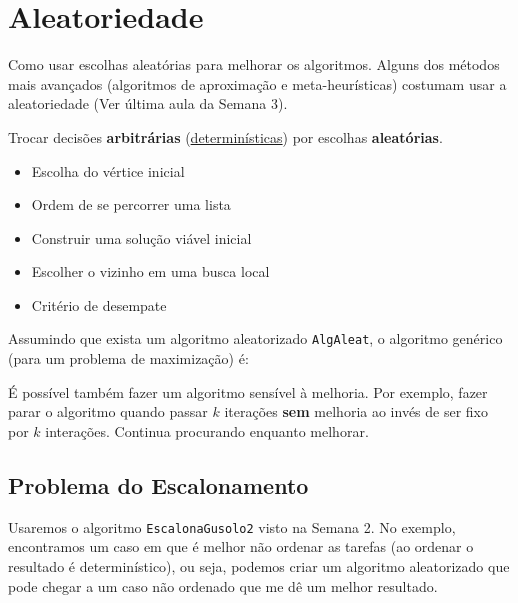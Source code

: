 \chapter{Aleatoriedade}

Como usar escolhas aleatórias para melhorar os algoritmos. Alguns dos métodos mais avançados (algoritmos de aproximação e meta-heurísticas) costumam usar a aleatoriedade (Ver última aula da Semana 3).

Trocar decisões \textbf{arbitrárias} (\underline{determinísticas}) por escolhas \textbf{aleatórias}.

\begin{itemize}
	\item Escolha do vértice inicial
	\item Ordem de se percorrer uma lista
	\item Construir uma solução viável inicial
	\item Escolher o vizinho em uma busca local
	\item Critério de desempate
\end{itemize}

Assumindo que exista um algoritmo aleatorizado \lstinline{AlgAleat}, o algoritmo genérico (para um problema de maximização) é:

\begin{algorithm}
	\SetAlgoLined
\end{algorithm}

É possível também fazer um algoritmo sensível à melhoria. Por exemplo, fazer parar o algoritmo quando passar $k$ iterações \textbf{sem} melhoria ao invés de ser fixo por $k$ interações. Continua procurando enquanto melhorar.

\section{Problema do Escalonamento}

Usaremos o algoritmo \lstinline{EscalonaGusolo2} visto na Semana 2. No exemplo, encontramos um caso em que é melhor não ordenar as tarefas (ao ordenar o resultado é determinístico), ou seja, podemos criar um algoritmo aleatorizado que pode chegar a um caso não ordenado que me dê um melhor resultado.


